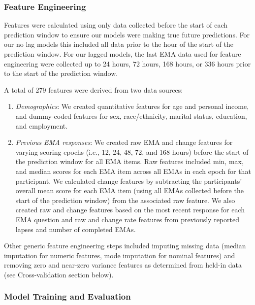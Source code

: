\documentclass[
]{agujournal2019}
\begin{document}
\subsubsection{Feature Engineering}\label{feature-engineering}

Features were calculated using only data collected before the start of
each prediction window to ensure our models were making true future
predictions. For our no lag models this included all data prior to the
hour of the start of the prediction window. For our lagged models, the
last EMA data used for feature engineering were collected up to 24
hours, 72 hours, 168 hours, or 336 hours prior to the start of the
prediction window.

A total of 279 features were derived from two data sources:

\begin{enumerate}
\def\labelenumi{\arabic{enumi}.}
\item
  \emph{Demographics}: We created quantitative features for age and
  personal income, and dummy-coded features for sex, race/ethnicity,
  marital status, education, and employment.
\item
  \emph{Previous EMA responses}: We created raw EMA and change features
  for varying scoring epochs (i.e., 12, 24, 48, 72, and 168 hours)
  before the start of the prediction window for all EMA items. Raw
  features included min, max, and median scores for each EMA item across
  all EMAs in each epoch for that participant. We calculated change
  features by subtracting the participants' overall mean score for each
  EMA item (using all EMAs collected before the start of the prediction
  window) from the associated raw feature. We also created raw and
  change features based on the most recent response for each EMA
  question and raw and change rate features from previously reported
  lapses and number of completed EMAs.
\end{enumerate}

Other generic feature engineering steps included imputing missing data
(median imputation for numeric features, mode imputation for nominal
features) and removing zero and near-zero variance features as
determined from held-in data (see Cross-validation section below).

\subsubsection{Model Training and
Evaluation}\label{model-training-and-evaluation}
\end{document}
